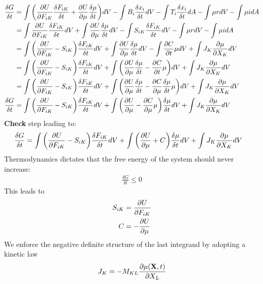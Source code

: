 \documentclass[12pt,3p]{article}
\numberwithin{equation}{section}
\begin{document}
\begin{align*}
\frac{\delta G}{\delta t} &= \int \bigg( \pdv{U}{F_{iK}} \frac{\delta F_{iK}}{\delta t} + \pdv{U}{\mu} \frac{\delta \mu}{\delta t} \bigg) dV - \int B_i \frac{\delta x_i}{\delta t} dV - \int T_i \frac{\delta x_i}{\delta t} dA - \int \mu r dV - \int \mu i dA \\
				&= \int \pdv{U}{F_{iK}} \frac{\delta F_{iK}}{\delta t} dV + \int \pdv{U}{\mu} \frac{\delta \mu}{\delta t} dV - \int S_{iK} \frac{\delta F_{iK}}{\delta t} dV - \int \mu r dV - \int \mu i dA \\
				&= \int \bigg( \pdv{U}{F_{iK}} - S_{iK} \bigg) \frac{\delta F_{iK}}{\delta t} dV + \int \pdv{U}{\mu} \frac{\delta \mu}{\delta t} dV - \int \pdv{C}{t} \mu dV + \int J_K \pdv{\mu}{X_K} dV \\
				&= \int \bigg( \pdv{U}{F_{iK}} - S_{iK} \bigg) \frac{\delta F_{iK}}{\delta t} dV + \int \bigg( \pdv{U}{\mu} \frac{\delta \mu}{\delta t} - \pdv{C}{t} \mu \bigg) dV + \int J_K \pdv{\mu}{X_K} dV \\
				&= \int \bigg( \pdv{U}{F_{iK}} - S_{iK} \bigg) \frac{\delta F_{iK}}{\delta t} dV + \int \bigg( \pdv{U}{\mu} \frac{\delta \mu}{\delta t} - \pdv{C}{\mu} \frac{\delta \mu}{\delta t } \mu \bigg) dV + \int J_K \pdv{\mu}{X_K} dV \\
\frac{\delta G}{\delta t} &= \int \bigg( \pdv{U}{F_{iK}} - S_{iK} \bigg) \frac{\delta F_{iK}}{\delta t} dV + \int \bigg( \pdv{U}{\mu} - \pdv{C}{\mu} \mu \bigg) \frac{\delta \mu}{\delta t } dV + \int J_K \pdv{\mu}{X_K} dV 
\end{align*}
\textbf{Check} step leading to: 
\begin{align*}
\frac{\delta G}{\delta t} &= \int \bigg( \pdv{U}{F_{iK}} - S_{iK} \bigg) \frac{\delta F_{iK}}{\delta t} dV + \int \bigg( \pdv{U}{\mu} + C \bigg) \frac{\delta \mu}{\delta t } dV + \int J_K \pdv{\mu}{X_K} dV 
\end{align*}
Thermodynamics dictates that the free energy of the system should never increase: 
\begin{align}\label{2ndLawThermo}
\frac{\delta G}{\delta t} \leq 0 
\end{align}
This leads to
\begin{align*}
S_{iK} &= \pdv{U}{F_{iK}} \\
C &= -\pdv{U}{\mu}
\end{align*}
We enforce the negative definite structure of the last integrand by adopting a kinetic law
\begin{equation}\label{kinLaw}
J_K = - M_{KL} \pdv{\mu (\mathbf{X}, t)}{X_L}
\end{equation}
\end{document}
